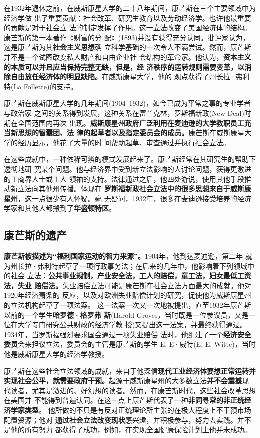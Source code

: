 在1932年退休之前，在威斯康星大学的二十八年期间，康芒斯在三个主要领域中为经济学做
出了重要贡献：社会改革、研究生教育以及劳动经济学。也许他最重要的贡献是对于社会立
法的制定发挥了作用。这一立法改变了美国经济体的结构。康芒斯的第一本著作《财富的分
配》(1893)并没有获得充分认同。批评家认为，这是康芒斯为其\textbf{社会主义思想}确
立科学基础的一次令人不满尝试。然而，康芒斯并不是一个试图改变私人财产和自由企业社
会结构的革命家。他认为，\textbf{资本主义的本质可以并且应当保持完整无缺，但是，经
济秩序的运转规则需要变革，以消除自由放任经济体的明显缺陷。}在威斯康星大学，他的
观点获得了州长拉·弗利特(La Follette)的支持。

康芒斯在威斯康星大学的几年期间(1904--1932)，如今已成为平常之事的专业学者与政治家
之间的关系得到发展，这种关系在富兰克林，罗斯福新政(New Deal)时期在全国范围内再次
出现。\textbf{威斯康星州政府广泛利用在麦迪逊的大学教职员工充当新思想的智囊团、法
律的起草者以及指定委员会的成员。}康芒斯在威斯康星大学的经历显示，他花了大量的时
间帮助起草、审查通过并执行社会立法。

在这些成就中，一种依稀可辨的模式发展起来了。康芒斯经常在其研究生的帮助下透彻地研
究某个问题。他与经济界中受到新立法影响的人讨论问题，获得更激进的工商界人士或工人
领袖的支持。法律通过之后，他四处游说，使用其他手段推动新立法向其他州传播。体现在
\textbf{罗斯福新政社会立法中的很多思想来自于威斯康星州}，这一点很少有人怀疑。毫
无疑问，1932年，很多在麦迪逊接受培养的经济学家和其他人都搬到了\textbf{华盛顿特区}。

\subsection{康芒斯的遗产}

\textbf{康芒斯被描述为“福利国家运动的智力来源”。}1904年，他到达麦迪逊，第二年
就为州长拉·弗利特起草了一项行政事务法；在后来的几年中，他影响着下列领域中的社会
立法：\textbf{公共事业规制，产业安全法，工人的赔偿，童工法，妇女最低工资法，失业
赔偿法。}失业赔偿立法可能是康芒斯在社会立法方面最大的成就。他对1920年经济萧条的
反应，以及对欧洲失业赔偿计划的研究，促使他为威斯康星州的立法机构起草了一项法案。
这一法案一次又一次地被提出，直至1932年康芒斯以前的一个学生\textbf{哈罗德·格罗弗
斯}(Harold Groves，当时既是一位参议员，又是一位在大学专门研究公共财政的经济学教
授)又提出这一法案，并最终获得通过。1934年，当罗斯福强烈要求国会通过一项失业赔偿
法时，他组建了一个\textbf{经济安全委员}会来担议立法，委员会的主管是康芒斯的学生
E. E·威特(E. E. Witte)，当时他是威斯康星大学的经济学教授。

康芒斯在这些社会立法领域的成就，来自于他深信\textbf{现代工业经济体要想正常运转并
实现社会公平，就需要政府干预。}起源于威斯康星州的大多数立法\textbf{并不会震撼}现
代读者，尤其是激进的、好幻想的读者。然而，在康芒斯时代，这些社会改革思想在美国并
不能得到普遍认同。在这一点上康芒斯代表了一种\textbf{非同寻常的非正统经济学家类型}。
他所做的不只是有反对正统理论所主张的在极大程度上不干预市场配置资源；他对
\textbf{通过社会立法改变现状}感兴趣，并积极参与，努力去实践。并不是他的所有努力
都获得了成功，例如，在实现全国健康保险计划上他并未成功。

